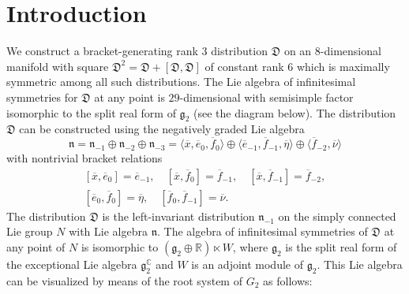 \documentclass[11pt,letterpaper]{amsart}
\numberwithin{equation}{section}
\newcommand{\oline}{\overline}
\begin{document}
\section{Introduction}
We construct a bracket-generating rank $3$ distribution $\mathfrak{D}$ on an $8$-di\-men\-sion\-al manifold with square $\mathfrak{D}^2 = \mathfrak{D}+ [\mathfrak{D},\mathfrak{D}]$ of constant rank $6$ which is maximally symmetric among all such distributions. The Lie algebra of infinitesimal symmetries for $\mathfrak{D}$ at any point is $29$-dimensional with semisimple factor isomorphic to the split real form of $\mathfrak{g}_2$ (see the diagram below). The distribution $\mathfrak{D}$ can be constructed using the negatively graded Lie algebra 
\begin{equation}
    \label{n basis}
    \mathfrak{n} = \mathfrak{n}_{-1}\oplus\mathfrak{n}_{-2}\oplus\mathfrak{n}_{-3} = \langle \oline x,\oline e_0, \oline f_0\rangle \oplus \langle \oline e_{-1},\oline f_{-1},\oline \eta\rangle \oplus \langle \oline f_{-2},\oline \nu\rangle
\end{equation}
with nontrivial bracket relations
\begin{gather}
    \label{n rels}
    [\oline x, \oline e_0] = \oline e_{-1},\quad [\oline x, \oline f_{0}] = \oline f_{-1},\quad [\oline x, \oline f_{-1}] = \oline f_{-2},\\
    [\oline e_0, \oline f_0]=\oline\eta,\quad [\oline f_0, \oline f_{-1}]=\oline\nu.
\end{gather}
The distribution $\mathfrak D$ is the left-invariant distribution $\mathfrak n_{-1}$ on the simply connected Lie group $N$ with Lie algebra $\mathfrak n$. The algebra of infinitesimal symmetries of $\mathfrak{D}$ at any point of $N$ is isomorphic to $(\mathfrak{g}_2\oplus \mathbb{R})\ltimes W$, where $\mathfrak{g}_2$ is the split real form of the exceptional Lie algebra $\mathfrak g^\mathbb C_2$ and $W$ is an adjoint module of $\mathfrak{g}_2$. This Lie algebra can be visualized by means of the root system of $G_2$ as follows:
\end{document}
